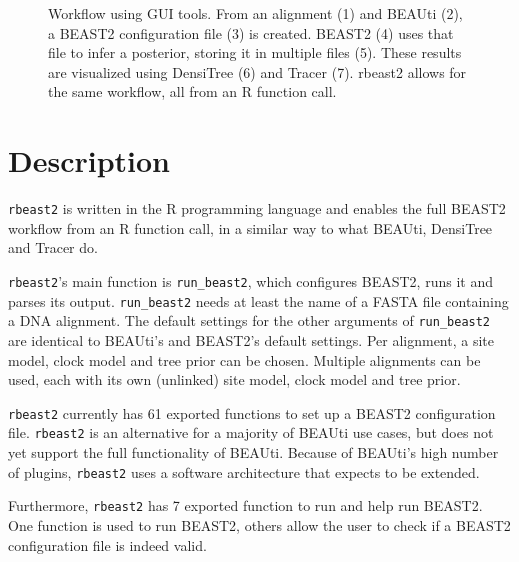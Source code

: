 \documentclass{article}
\begin{document}
\begin{figure}
{
  }
  \caption{
    Workflow using GUI tools. From an alignment (1) and BEAUti (2), 
    a BEAST2 configuration file (3) is created. BEAST2 (4) uses that file
    to infer a posterior, storing it in multiple files (5). These results
    are visualized using DensiTree (6) and Tracer (7). rbeast2 allows
    for the same workflow, all from an R function call.
  }
  \label{fig:workflow}
\end{figure}

\section{Description}

\verb;rbeast2; is written in the R programming language \cite{R}
and enables the full BEAST2 workflow from an R function call,
in a similar way to what BEAUti, DensiTree and Tracer do.

\verb;rbeast2;'s main function is \verb;run_beast2;, which
configures BEAST2, runs it and parses its output. 
\verb;run_beast2; needs at least the name of a 
FASTA file containing a DNA alignment. 
The default settings for the other arguments of \verb;run_beast2; 
are identical to BEAUti's and BEAST2's default settings.
Per alignment, a site model, clock model and tree prior can be chosen.
Multiple alignments can be used, each with its own (unlinked) site model, 
clock model and tree prior.

\verb;rbeast2; currently has 61 exported functions to set up  
a BEAST2 configuration file. 
\verb;rbeast2; is an alternative for a majority of BEAUti use cases, 
but does not yet support the full functionality of BEAUti. 
Because of BEAUti's high number of plugins, 
\verb;rbeast2; uses a software architecture that expects to be extended.

Furthermore, \verb;rbeast2; has 7 exported function to run and help run BEAST2.
One function is used to run BEAST2, others
allow the user to check if a BEAST2 configuration file is indeed valid.
\end{document}
